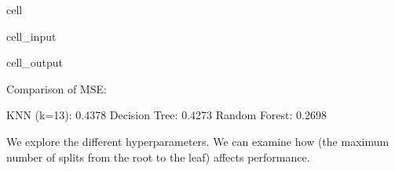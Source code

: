 \documentclass[letterpaper,10pt,english]{jupyterBook}
\begin{document}
\begin{sphinxuseclass}{cell}
\begin{sphinxVerbatimInput}
\begin{sphinxuseclass}{cell_input}
\begin{sphinxVerbatim}[commandchars=\\\{\}]
\end{sphinxVerbatim}

\end{sphinxuseclass}\end{sphinxVerbatimInput}
\begin{sphinxVerbatimOutput}

\begin{sphinxuseclass}{cell_output}
\begin{sphinxVerbatim}[commandchars=\\\{\}]
Comparison of MSE:
\end{sphinxVerbatim}

\begin{sphinxVerbatim}[commandchars=\\\{\}]
KNN (k=13): 0.4378
Decision Tree: 0.4273
Random Forest: 0.2698
\end{sphinxVerbatim}

\end{sphinxuseclass}\end{sphinxVerbatimOutput}

\end{sphinxuseclass}
\sphinxAtStartPar
We explore the different hyper\sphinxhyphen{}parameters.
We can examine how  (the maximum number of splits from the root to the leaf) affects performance.
\end{document}
